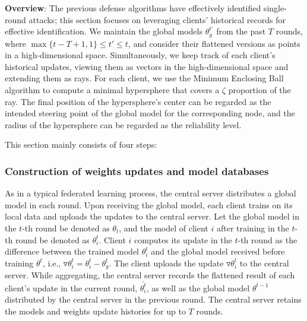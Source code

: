 \documentclass[lettersize,journal]{IEEEtran}
\begin{document}
\textbf{Overview}: The previous defense algorithms have effectively identified single-round attacks; this section focuses on leveraging clients' historical records for effective identification. We maintain the global models $\theta_g^{t'}$ from the past $T$ rounds, where $\max\{t-T+1, 1\}\leq t'\leq t$, and consider their flattened versions as points in a high-dimensional space. Simultaneously, we keep track of each client's historical updates, viewing them as vectors in the high-dimensional space and extending them as rays. For each client, we use the Minimum Enclosing Ball algorithm to compute a minimal hypersphere that covers a $\zeta$ proportion of the ray. The final position of the hypersphere's center can be regarded as the intended steering point of the global model for the corresponding node, and the radius of the hypersphere can be regarded as the reliability level.



This section mainly consists of four steps:

\subsubsection{Construction of weights updates and model databases}

As in a typical federated learning process, the central server distributes a global model in each round. Upon receiving the global model, each client trains on its local data and uploads the updates to the central server. Let the global model in the $t$-th round be denoted as $\theta_t$, and the model of client $i$ after training in the $t$-th round be denoted as $\theta^t_i$. Client $i$ computes its update in the $t$-th round as the difference between the trained model $\theta^t_{i}$ and the global model received before training $\theta^t$, i.e., $\triangledown \theta^t_{i} = \theta^t_{i} - \theta_g^t$. The client uploads the update $\triangledown \theta^t_{i}$ to the central server. While aggregating, the central server records the flattened result of each client's update in the current round, $\bar{\theta_i^t}$, as well as the global model $\theta^{t-1}$ distributed by the central server in the previous round. The central server retains the models and weights update histories for up to $T$ rounds.%
\end{document}
